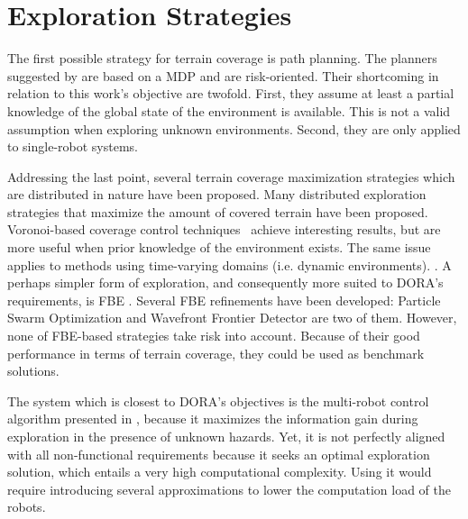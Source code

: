 \section{Exploration Strategies}
The first possible strategy for terrain coverage is path planning. The planners suggested by \cite{undurti2010online,thiebaux2016rao,xiao2020robot} are based on a \ac{MDP} and are risk-oriented. Their shortcoming in relation to this work's objective are twofold. First, they assume at least a partial knowledge of the global state of the environment is available. This is not a valid assumption when exploring unknown environments. Second, they are only applied to single-robot systems.

Addressing the last point, several terrain coverage maximization strategies which are distributed in nature have been proposed. Many distributed exploration strategies that maximize the amount of covered terrain have been proposed. Voronoi-based coverage control techniques~\cite{luo2019voronoi,santos2019decentralized} achieve interesting results, but are more useful when prior knowledge of the environment exists. The same issue applies to methods using time-varying domains (i.e. dynamic environments). \cite{santos2019decentralized,xu2019multi}. A perhaps simpler form of exploration, and consequently more suited to \ac{DORA}'s requirements, is \ac{FBE} \cite{yamauchi1998frontier}. Several \ac{FBE} refinements have been developed: Particle Swarm Optimization \cite{wang2011frontier} and Wavefront Frontier Detector \cite{topiwala2018frontier} are two of them. However, none of \ac{FBE}-based strategies take risk into account. Because of their good performance in terms of terrain coverage, they could be used as benchmark solutions.

The system which is closest to \ac{DORA}'s objectives is the multi-robot control algorithm presented in \cite{dames2012decentralized,schwagerMultirobotControlPolicy2017}, because it maximizes the information gain during exploration in the presence of unknown hazards. Yet, it is not perfectly aligned with all non-functional requirements because it seeks an optimal exploration solution, which entails a very high computational complexity. Using it would require introducing several approximations to lower the computation load of the robots.



